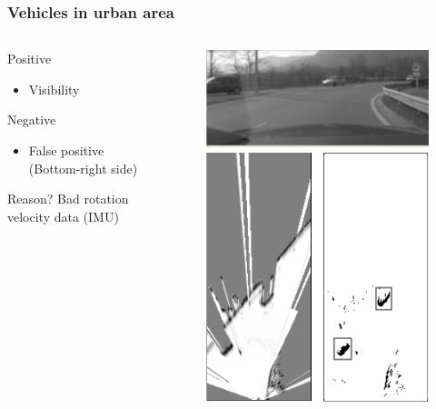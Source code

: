 \documentclass{beamer}
\begin{document}
	\begin{frame}
		\frametitle{Vehicles in urban area}
		
		\begin{columns}[t]
			\begin{column}[t]{5cm}
				\begin{exampleblock}{Positive}
				\begin{itemize}
				\item Visibility
				\end{itemize}
				\end{exampleblock}
								
				\begin{alertblock}{Negative}
				\begin{itemize}
				\item False positive (Bottom-right side)
				\end{itemize}
				\end{alertblock}					
				
				\begin{block}{Reason?}
				Bad rotation velocity data (IMU)
				\end{block}
			\end{column}
			\begin{column}[t]{5cm}
				\begin{figure}[h]
				\center
				\includegraphics[scale=0.55]{../img/fig:result:scenetwocars}
				\end{figure}
			\end{column}
		\end{columns}		


\end{frame}
\end{document}
